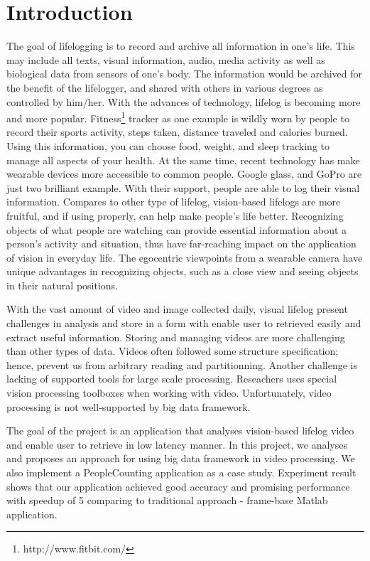 \section{Introduction}
\label{sec:sec_intro}

The goal of lifelogging is to record and archive all information in one's life. 
This may include all texts, visual information, audio, media activity as well 
as biological data from sensors of one's body. The information would be archived
for the benefit of the lifelogger, and shared with others in various degrees as
controlled by him/her.  With the advances of technology, lifelog is becoming more
 and more popular. Fitness\footnote{http://www.fitbit.com/} tracker as one
 example is wildly worn by people to record  their sports activity, steps taken, distance traveled and calories
 burned.  Using this information, you can choose food, weight, and sleep
 tracking  to manage all aspects of your health.  At the same time, recent 
 technology has make wearable devices more accessible to common people. Google
 glass, and GoPro are just two brilliant example. With their support,  people
 are able to log their visual information.
Compares to other type of lifelog, vision-based lifelogs are more fruitful, and
if using properly, can help make people's life better. Recognizing objects of 
what people are watching can provide essential information about a person's 
activity and situation, thus have far-reaching impact on the application of 
vision in everyday life. The egocentric viewpoints from a wearable camera have
unique advantages in recognizing objects, such as a close view and seeing
objects in their natural positions.

With the vast amount of video and image collected daily, visual lifelog present 
challenges in analysis and store in a form with enable user to retrieved easily 
and extract useful information. Storing and managing videos are more challenging
than other types of data. Videos often followed some structure specification;
hence, prevent us from arbitrary reading and partitionning. Another challenge
is lacking of supported tools for large scale processing. Reseachers uses
special vision processing toolboxes when working with video. Unfortunately,
video processing is not well-supported by big data framework.

The goal of the project is an application that 
analyses vision-based lifelog video and enable user to retrieve in low
latency manner. In this project, we analyses and proposes an approach for using
big data framework in video processing. We also implement a PeopleCounting
application as a case study. Experiment result shows that our application
achieved good accuracy and promising performance with speedup of 5 comparing to
traditional approach - frame-base Matlab application.

